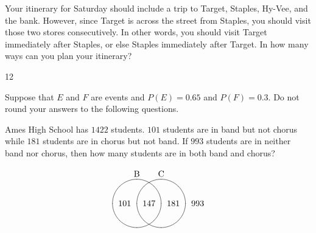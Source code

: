 \documentclass[answers,addpoints,12pt]{exam}
\begin{document}
\begin{questions}
\question[16] Your itinerary for Saturday should
include a trip to Target, Staples, Hy-Vee, and the bank.
However, since Target is across the street from Staples,
you should visit those two stores consecutively. In other
words, you should visit Target immediately after Staples, or else
Staples immediately after Target. In how many ways
can you plan your itinerary?
\begin{solution}[4in]12\end{solution}

\question[15] Suppose that $E$ and $F$ are events
and $P\left(E\right)=0.65$ and $P\left(F\right)=0.3$.
Do not round your answers to the following questions.
\ifprintanswers\else\newpage\fi

\question[18] Ames High School has $1422$ students.
$101$ students are in band but not chorus while
$181$ students are in chorus but not band.
If $993$ students are in neither band nor chorus,
then how many students are in both band and chorus?
\begin{solution}[4in]
\[\begin{xy}<.5cm,0cm>:
(-1,2)*+!D{\text{B}};
(1,2)*+!D{\text{C}};
(-1,0)*\cir<1cm>{};
(1,0)*\cir<1cm>{};
(0,0)*{147};
(-2,0)*{101};
(2,0)*{181};
(4,0)*{993};
\end{xy}\]
\end{solution}

\end{questions}

\vfill\ifprintanswers\else
\begin{center}\gradetable[h][questions]\end{center}\fi
\end{document}
